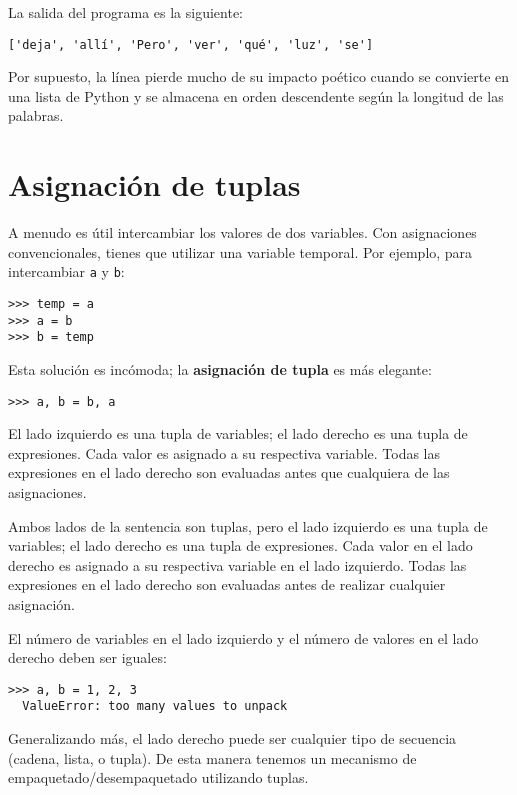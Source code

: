 La salida del programa es la siguiente:

\begin{Verbatim}
['deja', 'allí', 'Pero', 'ver', 'qué', 'luz', 'se']
\end{Verbatim}

Por supuesto, la línea pierde mucho de su impacto poético cuando se
convierte en una lista de Python y se almacena en orden descendente
según la longitud de las palabras.


\section{Asignación de tuplas}

A menudo es útil intercambiar los valores de dos variables.
Con asignaciones convencionales, tienes que utilizar una variable
temporal.  Por ejemplo, para intercambiar \texttt{a} y \texttt{b}:

\begin{Verbatim}
>>> temp = a
>>> a = b
>>> b = temp
\end{Verbatim}
%
Esta solución es incómoda; la \textbf{asignación de tupla} es más elegante:

\begin{Verbatim}
>>> a, b = b, a
\end{Verbatim}
%
El lado izquierdo es una tupla de variables; el lado derecho es una tupla de
expresiones.  Cada valor es asignado a su respectiva variable.
Todas las expresiones en el lado derecho son evaluadas antes que cualquiera
de las asignaciones.

Ambos lados de la sentencia son tuplas, pero el lado izquierdo es una
tupla de variables; el lado derecho es una tupla de expresiones. Cada
valor en el lado derecho es asignado a su respectiva variable en el lado
izquierdo. Todas las expresiones en el lado derecho son evaluadas antes
de realizar cualquier asignación.

El número de variables en el lado izquierdo y el número de valores en el
lado derecho deben ser iguales:

 

\begin{Verbatim}[frame=single]
>>> a, b = 1, 2, 3
  ValueError: too many values to unpack
\end{Verbatim}

Generalizando más, el lado derecho puede ser cualquier tipo de secuencia
(cadena, lista, o tupla). De esta manera tenemos un mecanismo de empaquetado/desempaquetado utilizando tuplas.

